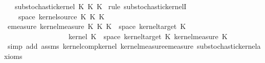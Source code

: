 \begin{isabellebody}
\ \ \ {\isachardoublequoteopen}substochastic{\isacharunderscore}{\kern0pt}kernel\ {\isacharparenleft}{\kern0pt}K\ {\isasymcirc}\isactrlsub K\ K\isanewline
%
\isadelimproof
%
\endisadelimproof
%
\isatagproof
{}\isamarkupfalse%
\ {\isacharparenleft}{\kern0pt}rule\ substochastic{\isacharunderscore}{\kern0pt}kernelI{\isacharparenright}{\kern0pt}\isanewline
\ \ \isamarkupfalse%
\ {\isasymomega}\ \isamarkupfalse%
\ {\isasymomega}{\isacharcolon}{\kern0pt}\ {\isachardoublequoteopen}{\isasymomega}\ {\isasymin}\ space\ {\isacharparenleft}{\kern0pt}kernel{\isacharunderscore}{\kern0pt}source\ {\isacharparenleft}{\kern0pt}K\ {\isasymcirc}\isactrlsub K\ K\isanewline
\ \ \isamarkupfalse%
\ \isamarkupfalse%
\ {\isachardoublequoteopen}emeasure\ {\isacharparenleft}{\kern0pt}kernel{\isacharunderscore}{\kern0pt}measure\ {\isacharparenleft}{\kern0pt}K\ {\isasymcirc}\isactrlsub K\ K\ {\isasymomega}{\isacharparenright}{\kern0pt}\ {\isacharparenleft}{\kern0pt}space\ {\isacharparenleft}{\kern0pt}kernel{\isacharunderscore}{\kern0pt}target\ K\ {\isacharequal}{\kern0pt}\ \isanewline
\ \ \ \ \ \ \ \ \ \ \ \ \ \ \ \ {\isasymintegral}\isactrlsup {\isacharplus}{\kern0pt}\ {\isasymomega}\ kernel\ K\ {\isasymomega}\ {\isacharparenleft}{\kern0pt}space\ {\isacharparenleft}{\kern0pt}kernel{\isacharunderscore}{\kern0pt}target\ K\ {\isasympartial}kernel{\isacharunderscore}{\kern0pt}measure\ K\ {\isasymomega}{\isachardoublequoteclose}\isanewline
\ \ \ \ \isamarkupfalse%
\ {\isacharparenleft}{\kern0pt}simp\ add{\isacharcolon}{\kern0pt}\ assms{\isacharparenleft}{\kern0pt}{}{\isacharcomma}{\kern0pt}{}{\isacharparenright}{\kern0pt}\ kernel{\isacharunderscore}{\kern0pt}comp{\isacharunderscore}{\kern0pt}kernel\ kernel{\isacharunderscore}{\kern0pt}measure{\isacharunderscore}{\kern0pt}emeasure\ substochastic{\isacharunderscore}{\kern0pt}kernel{\isachardot}{\kern0pt}axioms{\isacharparenleft}{\kern0pt}{}{\isacharparenright}{\kern0pt}{\isacharparenright}{\kern0pt}\isanewline

\end{isabellebody}
